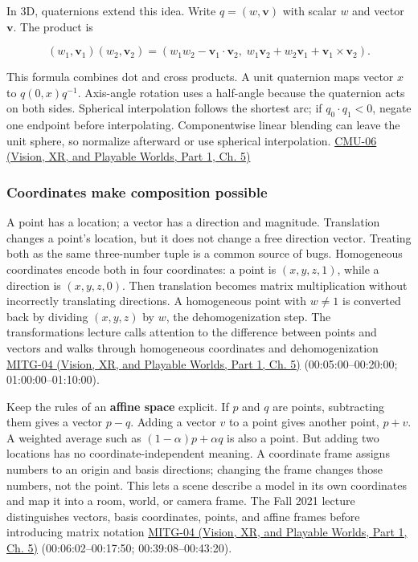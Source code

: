 In 3D, quaternions extend this idea. Write \(q=(w,\mathbf v)\) with scalar \(w\) and vector \(\mathbf v\). The product is

\[
(w_1,\mathbf v_1)(w_2,\mathbf v_2)=
(w_1w_2-\mathbf v_1\cdot\mathbf v_2,\;w_1\mathbf v_2+w_2\mathbf v_1+\mathbf v_1\times\mathbf v_2).
\]

This formula combines dot and cross products. A unit quaternion maps vector \(x\) to \(q(0,x)q^{-1}\). Axis-angle rotation uses a half-angle because the quaternion acts on both sides. Spherical interpolation follows the shortest arc; if \(q_0\cdot q_1<0\), negate one endpoint before interpolating. Componentwise linear blending can leave the unit sphere, so normalize afterward or use spherical interpolation. \href{../07-Vision-XR-and-Playable-Worlds-P01/main.pdf\#04-visual-computing-ii-ch036-cmu-06---3d-rotations-and-complex-representations}{CMU-06 (Vision, XR, and Playable Worlds, Part 1, Ch. 5)}

\subsubsection{Coordinates make composition possible}\label{03-visual-computing-i-ch001-coordinates-make-composition-possible}

\hypertarget{03-visual-computing-i-ch001-coordinates-make-composition-possible}{}

A point has a location; a vector has a direction and magnitude. Translation changes a point's location, but it does not change a free direction vector. Treating both as the same three-number tuple is a common source of bugs. Homogeneous coordinates encode both in four coordinates: a point is \((x,y,z,1)\), while a direction is \((x,y,z,0)\). Then translation becomes matrix multiplication without incorrectly translating directions. A homogeneous point with \(w\ne 1\) is converted back by dividing \((x,y,z)\) by \(w\), the dehomogenization step. The transformations lecture calls attention to the difference between points and vectors and walks through homogeneous coordinates and dehomogenization \href{../07-Vision-XR-and-Playable-Worlds-P01/main.pdf\#04-visual-computing-ii-ch036-mitg-04---transformations}{MITG-04 (Vision, XR, and Playable Worlds, Part 1, Ch. 5)} (00:05:00--00:20:00; 01:00:00--01:10:00).

Keep the rules of an \textbf{affine space} explicit. If \(p\) and \(q\) are points, subtracting them gives a vector \(p-q\). Adding a vector \(v\) to a point gives another point, \(p+v\). A weighted average such as \((1-\alpha)p+\alpha q\) is also a point. But adding two locations has no coordinate-independent meaning. A coordinate frame assigns numbers to an origin and basis directions; changing the frame changes those numbers, not the point. This lets a scene describe a model in its own coordinates and map it into a room, world, or camera frame. The Fall 2021 lecture distinguishes vectors, basis coordinates, points, and affine frames before introducing matrix notation \href{../07-Vision-XR-and-Playable-Worlds-P01/main.pdf\#04-visual-computing-ii-ch036-mitg-04---transformations}{MITG-04 (Vision, XR, and Playable Worlds, Part 1, Ch. 5)} (00:06:02--00:17:50; 00:39:08--00:43:20).

